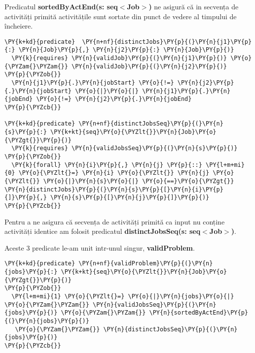 Predicatul \textbf{sortedByActEnd(s: seq$<$Job$>$)} ne asigură că in secvența de activități primită  activitățile sunt sortate din punct de vedere al timpului de încheiere. 
\begin{Verbatim}[commandchars=\\\{\}, fontsize=\small]
\PY{k+kd}{predicate}  \PY{n+nf}{distinctJobs}\PY{p}{(}\PY{n}{j1}\PY{p}{:} \PY{n}{Job}\PY{p}{,} \PY{n}{j2}\PY{p}{:} \PY{n}{Job}\PY{p}{)}
  \PY{k}{requires} \PY{n}{validJob}\PY{p}{(}\PY{n}{j1}\PY{p}{)} \PY{o}{\PYZam{}\PYZam{}} \PY{n}{validJob}\PY{p}{(}\PY{n}{j2}\PY{p}{)}
\PY{p}{\PYZob{}}
  \PY{n}{j1}\PY{p}{.}\PY{n}{jobStart} \PY{o}{!=} \PY{n}{j2}\PY{p}{.}\PY{n}{jobStart} \PY{o}{|}\PY{o}{|} \PY{n}{j1}\PY{p}{.}\PY{n}{jobEnd} \PY{o}{!=} \PY{n}{j2}\PY{p}{.}\PY{n}{jobEnd}
\PY{p}{\PYZcb{}}

\PY{k+kd}{predicate} \PY{n+nf}{distinctJobsSeq}\PY{p}{(}\PY{n}{s}\PY{p}{:} \PY{k+kt}{seq}\PY{o}{\PYZlt{}}\PY{n}{Job}\PY{o}{\PYZgt{}}\PY{p}{)}
  \PY{k}{requires} \PY{n}{validJobsSeq}\PY{p}{(}\PY{n}{s}\PY{p}{)}
\PY{p}{\PYZob{}}
  \PY{k}{forall} \PY{n}{i}\PY{p}{,} \PY{n}{j} \PY{p}{::} \PY{l+m+mi}{0} \PY{o}{\PYZlt{}=} \PY{n}{i} \PY{o}{\PYZlt{}} \PY{n}{j} \PY{o}{\PYZlt{}} \PY{o}{|}\PY{n}{s}\PY{o}{|} \PY{o}{==}\PY{o}{\PYZgt{}} \PY{n}{distinctJobs}\PY{p}{(}\PY{n}{s}\PY{p}{[}\PY{n}{i}\PY{p}{]}\PY{p}{,} \PY{n}{s}\PY{p}{[}\PY{n}{j}\PY{p}{]}\PY{p}{)}
\PY{p}{\PYZcb{}}
\end{Verbatim}

Pentru a ne asigura că secvența de activități primită  ca input nu conține activități identice am folosit predicatul \textbf{distinctJobsSeq(s: seq$<$Job$>$)}. 

Aceste 3 predicate le-am unit intr-unul singur, \textbf{validProblem}.

\begin{Verbatim}[commandchars=\\\{\}, fontsize=\small]
    \PY{k+kd}{predicate} \PY{n+nf}{validProblem}\PY{p}{(}\PY{n}{jobs}\PY{p}{:} \PY{k+kt}{seq}\PY{o}{\PYZlt{}}\PY{n}{Job}\PY{o}{\PYZgt{}}\PY{p}{)}
\PY{p}{\PYZob{}}
  \PY{l+m+mi}{1} \PY{o}{\PYZlt{}=} \PY{o}{|}\PY{n}{jobs}\PY{o}{|} \PY{o}{\PYZam{}\PYZam{}} \PY{n}{validJobsSeq}\PY{p}{(}\PY{n}{jobs}\PY{p}{)} \PY{o}{\PYZam{}\PYZam{}} \PY{n}{sortedByActEnd}\PY{p}{(}\PY{n}{jobs}\PY{p}{)}
   \PY{o}{\PYZam{}\PYZam{}} \PY{n}{distinctJobsSeq}\PY{p}{(}\PY{n}{jobs}\PY{p}{)}
\PY{p}{\PYZcb{}}
\end{Verbatim}

